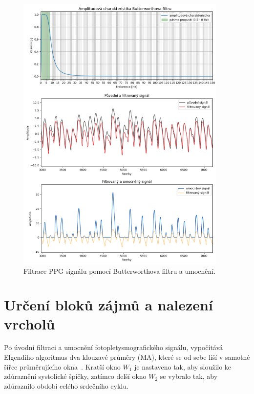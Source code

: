 \begin{figure}[h]
	\centering
	\includegraphics[width=0.93\textwidth]{./obrazky/ElgendiAFC_PP_Sq.png}
	\vspace{-4mm}
	\caption[Elgendiho předzpracování PPG signálu]{Filtrace PPG signálu pomocí Butterworthova filtru a umocnění.}
	\vspace{-15mm}
	\label{fig:filter-example}
\end{figure}

\section{Určení bloků zájmů a nalezení vrcholů}
\label{sec:thr_peaks}

Po úvodní filtraci a umocnění fotopletysmografického signálu, vypočítává Elgendiho algoritmus dva klouzavé průměry (\acs{MA}), které se od sebe liší v samotné šířce průměrujícího okna~\cite{Elgendi2013}.
Kratší okno \(W_1\) je nastaveno tak, aby sloužilo ke zdůraznění systolické špičky, zatímco delší okno \(W_2\) se vybralo tak, aby zdůraznilo období celého srdečního cyklu.

